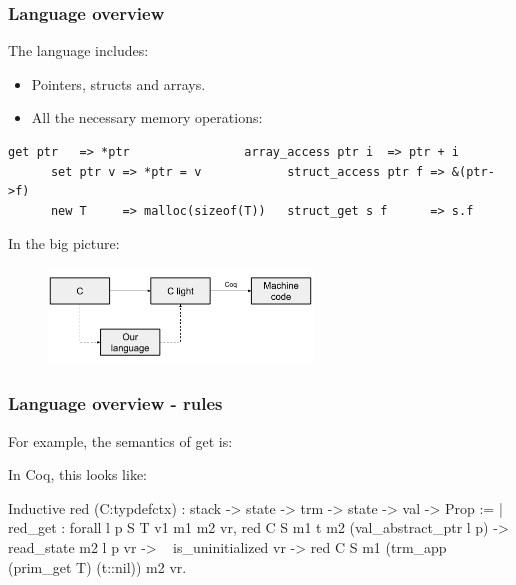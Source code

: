 \begin{frame}[fragile]
\frametitle{Language overview}

The language includes:
\begin{itemize}
	\item Pointers, structs and arrays.
	\item All the necessary memory operations:
\end{itemize}

\begin{Verbatim}[fontsize=\scriptsize]
      get ptr   => *ptr                array_access ptr i  => ptr + i
      set ptr v => *ptr = v            struct_access ptr f => &(ptr->f)
      new T     => malloc(sizeof(T))   struct_get s f      => s.f
\end{Verbatim}

\bigskip

In the big picture:

\begin{figure}[H]
\centering
\includegraphics[width=7cm]{images/compcert_our_language}
\end{figure}

\end{frame}


\begin{frame}[fragile]
\frametitle{Language overview - rules}

For example, the semantics of get is:
\begin{center}
  \begin{prooftree}
  \end{prooftree}
\end{center}

In Coq, this looks like:

\begin{coqs}
Inductive red (C:typdefctx) : stack -> state -> trm -> state -> val -> Prop :=
  | red_get : forall l p S T v1 m1 m2 vr,
      red C S m1 t m2 (val_abstract_ptr l p) ->
      read_state m2 l p vr ->
      ~ is_uninitialized vr ->
      red C S m1 (trm_app (prim_get T) (t::nil)) m2 vr.
\end{coqs}

\end{frame}


